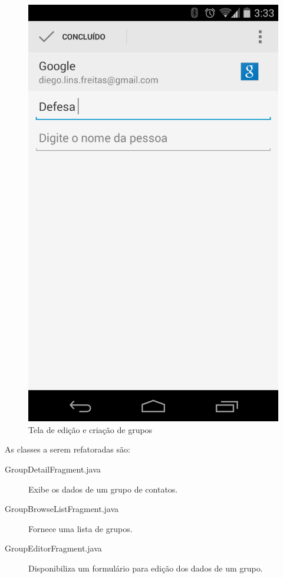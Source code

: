 \documentclass[conference]{IEEEtran}
\begin{document}
\begin{figure}[htb]
\begin{minipage}[b]{0.45\linewidth}
	\end{minipage}
\quad
	\begin{minipage}[b]{0.45\linewidth}
		\begin{center} 
			\includegraphics[scale=0.18]{img/contacts_edit.png}
		\end{center}
		\caption{\label{fig:groups_edit} Tela de edição e criação de grupos}
		 
	\end{minipage}
\end{figure}


As classes a serem refatoradas são:
\begin{description}
\item[GroupDetailFragment.java] Exibe os dados de um grupo de contatos.
\item[GroupBrowseListFragment.java] Fornece uma lista de grupos.
\item[GroupEditorFragment.java] Disponibiliza um formulário para edição dos
dados de um grupo.
\end{description}
\end{document}
